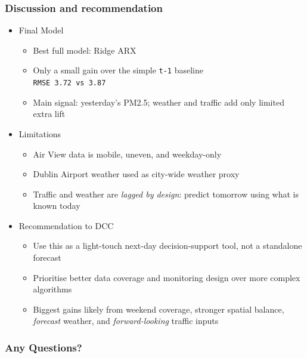 \documentclass{beamer}
\begin{document}
	\begin{frame}
		\frametitle{Discussion and recommendation}
		\begin{itemize}
			\item Final Model 
				\begin{itemize}
					\item Best full model: Ridge ARX
					\item Only a small gain over the simple \texttt{t-1} baseline\\ \texttt{RMSE 3.72 vs 3.87}
					\item Main signal: yesterday’s PM2.5; weather and traffic add only limited extra lift
				\end{itemize}
			\item Limitations
				\begin{itemize}
					\item Air View data is mobile, uneven, and weekday-only
					\item Dublin Airport weather used as city-wide weather proxy
					\item Traffic and weather are \textit{lagged by design}: predict tomorrow using what is known today
				\end{itemize}
			\item Recommendation to DCC 
				\begin{itemize}
					\item Use this as a light-touch next-day decision-support tool, not a standalone forecast
					\item Prioritise better data coverage and monitoring design over more complex algorithms
					\item Biggest gains likely from weekend coverage, stronger spatial balance, \textit{forecast} weather, and \textit{forward-looking} traffic inputs
				\end{itemize}
		\end{itemize}
		
	\end{frame}
	
	\begin{frame}
		\frametitle{Any Questions?}
	\end{frame}
	
\end{document}
